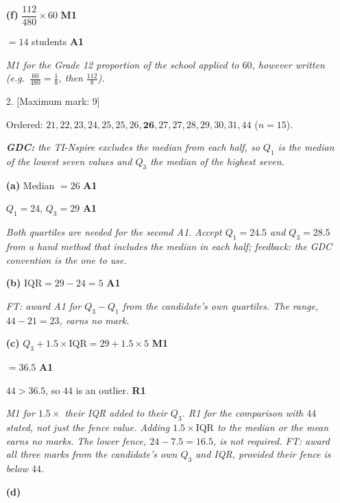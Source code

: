 \documentclass[12pt, twoside]{article}
\begin{document}
\begin{enumerate}[itemsep=0.3cm]
\textbf{(f)} $\dfrac{112}{480} \times 60$ \hfill \textbf{M1}

$= 14$ students \hfill \textbf{A1}

\emph{M1 for the Grade 12 proportion of the school applied to $60$, however
written (e.g.\ $\frac{60}{480} = \frac{1}{8}$, then $\frac{112}{8}$).}

\newpage

\item[2.] [Maximum mark: 9]

Ordered: $21, 22, 23, 24, 25, 25, 26, \mathbf{26}, 27, 27, 28, 29, 30, 31,
44$ \quad ($n = 15$).

\emph{\textbf{GDC:} the TI-Nspire excludes the median from each half, so
$Q_{1}$ is the median of the lowest seven values and $Q_{3}$ the median of
the highest seven.}

\textbf{(a)} Median $= 26$ \hfill \textbf{A1}

$Q_{1} = 24$, \quad $Q_{3} = 29$ \hfill \textbf{A1}

\emph{Both quartiles are needed for the second A1. Accept $Q_{1} = 24.5$ and
$Q_{3} = 28.5$ from a hand method that includes the median in each half;
feedback: the GDC convention is the one to use.}

\textbf{(b)} $\text{IQR} = 29 - 24 = 5$ \hfill \textbf{A1}

\emph{FT: award A1 for $Q_{3} - Q_{1}$ from the candidate's own quartiles.
The range, $44 - 21 = 23$, earns no mark.}

\textbf{(c)} $Q_{3} + 1.5 \times \text{IQR} = 29 + 1.5 \times 5$
\hfill \textbf{M1}

$= 36.5$ \hfill \textbf{A1}

$44 > 36.5$, so $44$ is an outlier. \hfill \textbf{R1}

\emph{M1 for $1.5 \times$ their IQR added to their $Q_{3}$. R1 for the
comparison with $44$ stated, not just the fence value. Adding
$1.5 \times \text{IQR}$ to the median or the mean earns no marks. The lower
fence, $24 - 7.5 = 16.5$, is not required. FT: award all three marks from the
candidate's own $Q_{3}$ and IQR, provided their fence is below $44$.}

\textbf{(d)}

\begin{center}
\end{center}


\end{enumerate}
\end{document}
